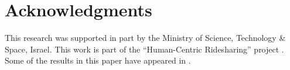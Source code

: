 \documentclass[sigconf]{aamas}
\begin{document}






\section{Acknowledgments}
This research was supported in part by the Ministry of Science, Technology \& Space, Israel. This work is part of the ``Human-Centric Ridesharing'' project \cite{levinger2020human}. Some of the results in this paper have appeared in \cite{levinger2022social}.

 

\end{document}
